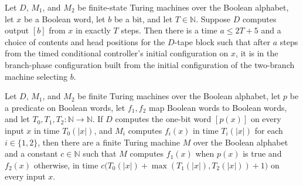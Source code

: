 \begin{lemma}
\label{Turing.FinTM.timed_start}
\leanok
{}
Let $D$, $M_1$, and $M_2$ be finite-state Turing machines over the Boolean alphabet, let
$x$ be a Boolean word, let $b$ be a bit, and let $T\in\mathbb N$. Suppose $D$ computes
output $[b]$ from $x$ in exactly $T$ steps. Then there is a time $a\le 2T+5$ and a
choice of contents and head positions for the $D$-tape block such that after $a$ steps
from the timed conditional controller's initial configuration on $x$, it is in the
branch-phase configuration built from the initial configuration of the two-branch
machine selecting $b$.
\end{lemma}

\begin{theorem}
\label{Turing.FinTM.computesFunInTime_cond}
\leanok
{}
Let $D$, $M_1$, and $M_2$ be finite Turing machines over the Boolean alphabet, let $p$
be a predicate on Boolean words, let $f_1,f_2$ map Boolean words to Boolean words, and
let $T_0,T_1,T_2 : \mathbb{N} \to \mathbb{N}$. If $D$ computes the one-bit word $[p(x)]$
on every input $x$ in time $T_0(|x|)$, and $M_i$ computes $f_i(x)$ in time $T_i(|x|)$
for each $i\in\{1,2\}$, then there are a finite Turing machine $M$ over the Boolean
alphabet and a constant $c\in\mathbb{N}$ such that $M$ computes $f_1(x)$ when $p(x)$ is
true and $f_2(x)$ otherwise, in time $c\bigl(T_0(|x|)+\max(T_1(|x|),T_2(|x|))+1\bigr)$
on every input $x$.
\end{theorem}

